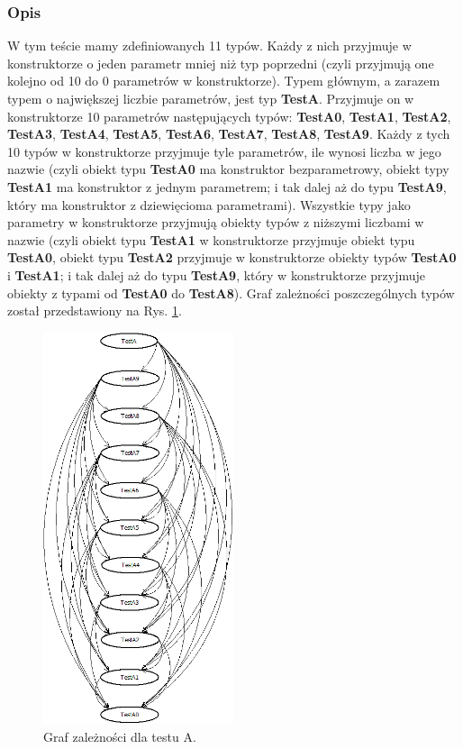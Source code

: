 \documentclass[12pt]{article}
\begin{document}
\subsubsection{Opis}
W tym teście mamy zdefiniowanych 11 typów. Każdy z nich przyjmuje w konstruktorze o jeden parametr mniej niż typ poprzedni (czyli przyjmują one kolejno od 10 do 0 parametrów w konstruktorze). Typem głównym, a zarazem typem o największej liczbie parametrów, jest typ \textbf{TestA}. Przyjmuje on w konstruktorze 10 parametrów następujących typów: \textbf{TestA0}, \textbf{TestA1}, \textbf{TestA2}, \textbf{TestA3}, \textbf{TestA4}, \textbf{TestA5}, \textbf{TestA6}, \textbf{TestA7}, \textbf{TestA8}, \textbf{TestA9}. Każdy z tych 10 typów w konstruktorze przyjmuje tyle parametrów, ile wynosi liczba w jego nazwie (czyli obiekt typu \textbf{TestA0} ma konstruktor bezparametrowy, obiekt typy \textbf{TestA1} ma konstruktor z jednym parametrem; i tak dalej aż do typu \textbf{TestA9}, który ma konstruktor z dziewięcioma parametrami). Wszystkie typy jako parametry w konstruktorze przyjmują obiekty typów z niższymi liczbami w nazwie (czyli obiekt typu \textbf{TestA1} w konstruktorze przyjmuje obiekt typu \textbf{TestA0}, obiekt typu \textbf{TestA2} przyjmuje w konstruktorze obiekty typów \textbf{TestA0} i \textbf{TestA1}; i tak dalej aż do typu \textbf{TestA9}, który w konstruktorze przyjmuje obiekty z typami od \textbf{TestA0} do \textbf{TestA8}). Graf zależności poszczególnych typów został przedstawiony na Rys. \ref{fig:testA}.\\
\begin{figure}[H]
	\begin{center}
  		\includegraphics[height=11.5cm]{TestA.png}
  		\caption{Graf zależności dla testu A.}
  		\label{fig:testA}
	\end{center}
\end{figure}
\end{document}
